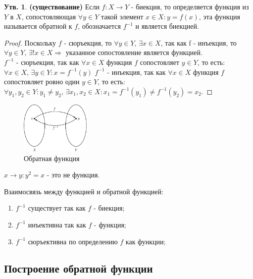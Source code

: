 \documentclass[12pt]{article}
\theoremstyle{definition}
\newtheorem{prop}{Утв.}
\begin{document}
\begin{prop} \textbf{(существование)}
Если $f \colon X \rightarrow Y$ - биекция, то определяется функция из $Y$ в $X$, сопостовляющая $\forall y \in Y$ такой элемент $x \in X\colon y = f(x)$, эта функция называется обратной к $f$, обозначается $f^{-1}$ и является биекцией.
\end{prop}
\begin{proof}
Поскольку $f$ - сюръекция, то $\forall y \in Y, \, \exists x \in X$, так как f - инъекция, то $\forall y \in Y, \, \exists! x \in X \Rightarrow$ указанное сопостовление является функцией.\\
$f^{-1}$ - сюръекция, так как $\forall x \in X$ функция $f$ сопостовляет $y \in Y$, то есть: $\forall x \in X, \, \exists y \in Y \colon x = f^{-1}(y)$
$f^{-1}$ - инъекция, так как $\forall x \in X$ функция $f$ сопостовляет ровно один $y \in Y$, то есть: \\
$\forall y_1, y_2 \in Y \colon  y_1 \neq y_2,\, \exists x_1, x_2 \in X\colon x_1 = f^{-1}(y_1) \neq  f^{-1}(y_2) = x_2$. 
\end{proof}
 
\begin{figure}[H]
	\centering
	\includegraphics[width=0.3\textwidth]{4_4.eps}
	\caption{Обратная функция}
	\label{4_4}
\end{figure}

$x \rightarrow y \colon y^2 = x$ - это не функция.

Взаимосвязь между функцией и обратной функцией:
\begin{enumerate}
	\item $f^{-1}$ существует так как $f$ - биекция;
	\item $f^{-1}$ инъективна так как $f$ - функция;
	\item $f^{-1}$ сюръективна по определению $f$ как функции;
\end{enumerate}

\subsection*{Построение обратной функции}
\end{document}
